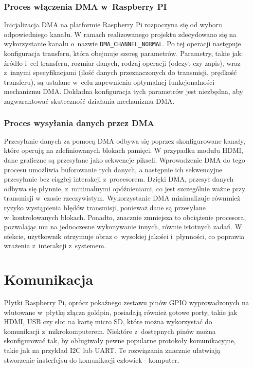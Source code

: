 \documentclass[shortabstract]{iithesis}
\begin{document}
\subsection{Proces włączenia DMA w~Raspberry PI}
Inicjalizacja DMA na platformie Raspberry Pi rozpoczyna się od wyboru odpowiedniego kanału. W ramach realizowanego projektu zdecydowano się na wykorzystanie kanału o~nazwie \texttt{DMA\_CHANNEL\_NORMAL}. Po tej operacji następuje konfiguracja transferu, która obejmuje szereg parametrów. Parametry, takie jak: źródło i~cel transferu, rozmiar danych, rodzaj operacji (odczyt czy zapis), wraz z~innymi specyfikacjami (ilość danych przeznaczonych do transmisji, prędkość transferu), są ustalane w~celu zapewnienia optymalnej funkcjonalności mechanizmu DMA. Dokładna konfiguracja tych parametrów jest niezbędna, aby zagwarantować skuteczność działania mechanizmu DMA.
\subsection{Proces wysyłania danych przez DMA}
Przesyłanie danych za pomocą DMA odbywa się poprzez skonfigurowane kanały, które operują na zdefiniowanych blokach pamięci. W przypadku modułu HDMI, dane graficzne są przesyłane jako sekwencje pikseli. Wprowadzenie DMA do tego procesu umożliwia buforowanie tych danych, a następnie ich sekwencyjne przesyłanie bez ciągłej interakcji z~procesorem. Dzięki DMA, przesył danych odbywa się płynnie, z~minimalnymi opóźnieniami, co jest szczególnie ważne przy transmisji w~czasie rzeczywistym. Wykorzystanie DMA minimalizuje równmież ryzyko wystąpienia błędów transmisji, ponieważ dane są przesyłane w~kontrolowanych blokach. Ponadto, znacznie zmniejsza to obciążenie procesora, pozwalając mu na jednoczesne wykonywanie innych, równie istotnych zadań. W efekcie, użytkownik otrzymuje obraz o~wysokiej jakości i~płynności, co poprawia wrażenia z~interakcji z~systemem.


\chapter{Komunikacja}
Płytki Raspberry Pi, oprócz pokaźnego zestawu pinów GPIO wyprowadzonych na wlutowane w~płytkę złącza goldpin, posiadają również gotowe porty, takie jak HDMI, USB czy slot na kartę micro SD, które można wykorzystać do komunikacji z~mikrokomputerem. Niektóre z~dostępnych pinów można skonfigurować tak, by obługiwały pewne popularne protokoły komunikacyjne, takie jak na przykład I2C lub UART. Te rozwiązania znacznie ułatwiają stworzenie insterfejsu do komunikacji człowiek - komputer.
\end{document}
